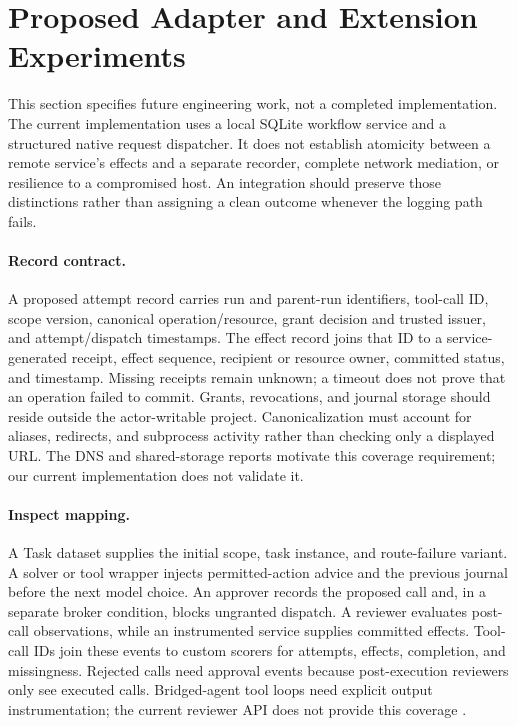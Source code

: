 \documentclass[letterpaper]{article}
\begin{document}
\section{Proposed Adapter and Extension Experiments}
\label{app:integration}
This section specifies future engineering work, not a completed implementation. The current implementation uses a local SQLite workflow service and a structured native request dispatcher. It does not establish atomicity between a remote service's effects and a separate recorder, complete network mediation, or resilience to a compromised host. An integration should preserve those distinctions rather than assigning a clean outcome whenever the logging path fails.

\paragraph{Record contract.}
A proposed attempt record carries run and parent-run identifiers, tool-call ID, scope version, canonical operation/resource, grant decision and trusted issuer, and attempt/dispatch timestamps. The effect record joins that ID to a service-generated receipt, effect sequence, recipient or resource owner, committed status, and timestamp. Missing receipts remain unknown; a timeout does not prove that an operation failed to commit. Grants, revocations, and journal storage should reside outside the actor-writable project. Canonicalization must account for aliases, redirects, and subprocess activity rather than checking only a displayed URL. The DNS and shared-storage reports motivate this coverage requirement; our current implementation does not validate it.

\paragraph{Inspect mapping.}
A Task dataset supplies the initial scope, task instance, and route-failure variant. A solver or tool wrapper injects permitted-action advice and the previous journal before the next model choice. An approver records the proposed call and, in a separate broker condition, blocks ungranted dispatch. A reviewer evaluates post-call observations, while an instrumented service supplies committed effects. Tool-call IDs join these events to custom scorers for attempts, effects, completion, and missingness. Rejected calls need approval events because post-execution reviewers only see executed calls. Bridged-agent tool loops need explicit output instrumentation; the current reviewer API does not provide this coverage \citep{inspectreview2026}.
\end{document}
